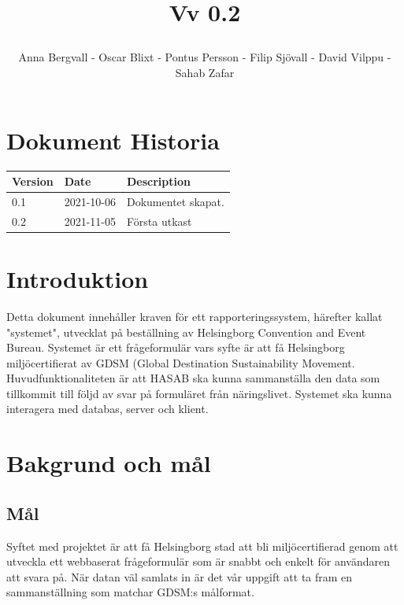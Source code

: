 \documentclass{article}
\date {#1}
\title {
    \documentNumber {01}    

    \documentTitle {Helsingborg Event and Convention Bureau}
    
    \documentDate {2021-08-20}
    \documentVersion Vv 0.2
    
    \author{Anna Bergvall - Oscar Blixt - Pontus Persson - Filip Sjövall - David Vilppu - Sahab Zafar}
}
\begin{document}
\maketitle

\thispagestyle{empty}



\newpage

\tableofcontents


\newpage

\section{Dokument Historia}
\begin{tabular}{ l | l | l }
    Version & Date & Description \\
    \hline
    0.1 & 2021-10-06 & Dokumentet skapat. \\
    0.2 & 2021-11-05 & Första utkast\\
    
\end{tabular}

\section{Introduktion}
    Detta dokument innehåller kraven för ett rapporteringssystem, härefter kallat "systemet", utvecklat på beställning av Helsingborg Convention and Event Bureau. Systemet är ett frågeformulär vars syfte är att få Helsingborg miljöcertifierat av GDSM (Global Destination Sustainability Movement. Huvudfunktionaliteten är att HASAB ska kunna sammanställa den data som tillkommit till följd av svar på formuläret från näringslivet. Systemet ska kunna interagera med databas, server och klient.
    

\section{Bakgrund och mål}

    \subsection{Mål}
      Syftet med projektet är att få Helsingborg stad att bli miljöcertifierad genom att utveckla ett webbaserat frågeformulär som är snabbt och enkelt för användaren att svara på. När datan väl samlats in är det vår uppgift att ta fram en sammanställning som matchar GDSM:s målformat.
        
\end{document}
